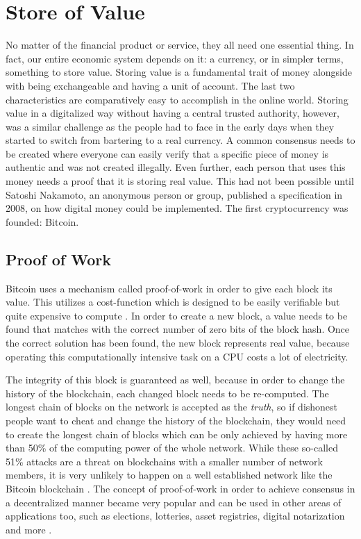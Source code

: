 \section{Store of Value}
\label{sec:storeofvalue}
No matter of the financial product or service, they all need one essential thing. In fact, our entire economic system depends on it: a currency, or in simpler terms, something to store value. Storing value is a fundamental trait of money alongside with being exchangeable and having a unit of account. The last two characteristics are comparatively easy to accomplish in the online world. Storing value in a digitalized way without having a central trusted authority, however, was a similar challenge as the people had to face in the early days when they started to switch from bartering to a real currency. A common consensus needs to be created where everyone can easily verify that a specific piece of money is authentic and was not created illegally. Even further, each person that uses this money needs a proof that it is storing real value. This had not been possible until Satoshi Nakamoto, an anonymous person or group, published a specification \cite{Nakamoto2008} in 2008, on how digital money could be implemented. The first cryptocurrency was founded: Bitcoin.

\subsection{Proof of Work}
Bitcoin uses a mechanism called proof-of-work in order to give each block its value. This utilizes a cost-function which is designed to be easily verifiable but quite expensive to compute \cite{Back2002}. In order to create a new block, a value needs to be found that matches with the correct number of zero bits of the block hash. Once the correct solution has been found, the new block represents real value, because operating this computationally intensive task on a CPU costs a lot of electricity.

The integrity of this block is guaranteed as well, because in order to change the history of the blockchain, each changed block needs to be re-computed. The longest chain of blocks on the network is accepted as the \textit{truth}, so if dishonest people want to cheat and change the history of the blockchain, they would need to create the longest chain of blocks which can be only achieved by having more than 50\% of the computing power of the whole network. While these so-called 51\% attacks are a threat on blockchains with a smaller number of network members, it is very unlikely to happen on a well established network like the Bitcoin blockchain \cite{Swan2015}. The concept of proof-of-work in order to achieve consensus in a decentralized manner became very popular and can be used in other areas of applications too, such as elections, lotteries, asset registries, digital notarization and more \cite{Antonopoulos2017}.

